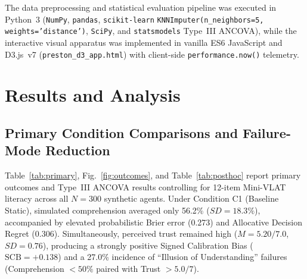 \documentclass[conference]{IEEEtran}
\newcommand{\SCB}{\mathrm{SCB}}
\begin{document}
The data preprocessing and statistical evaluation pipeline was executed in Python~3 (\texttt{NumPy}, \texttt{pandas}, \texttt{scikit-learn} \texttt{KNNImputer(n\_neighbors=5, weights='distance')}, \texttt{SciPy}, and \texttt{statsmodels} Type~III ANCOVA), while the interactive visual apparatus was implemented in vanilla ES6 JavaScript and D3.js~v7 (\texttt{preston\_d3\_app.html}) with client-side \texttt{performance.now()} telemetry.

\section{Results and Analysis}
\label{sec:results}
\subsection{Primary Condition Comparisons and Failure-Mode Reduction}
Table~\ref{tab:primary}, Fig.~\ref{fig:outcomes}, and Table~\ref{tab:posthoc} report primary outcomes and Type~III ANCOVA results controlling for 12-item Mini-VLAT literacy across all $N = 300$ synthetic agents. Under Condition C1 (Baseline Static), simulated comprehension averaged only 56.2\% ($SD = 18.3\%$), accompanied by elevated probabilistic Brier error (0.273) and Allocative Decision Regret (0.306). Simultaneously, perceived trust remained high ($M = 5.20/7.0$, $SD = 0.76$), producing a strongly positive Signed Calibration Bias ($\SCB = +0.138$) and a 27.0\% incidence of ``Illusion of Understanding'' failures (Comprehension $< 50\%$ paired with Trust $> 5.0/7$).
\end{document}
